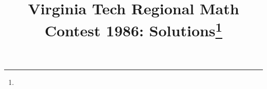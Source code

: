 \documentclass[10pt]{article}
\begin{document}
\title{Virginia Tech Regional Math Contest 1986: Solutions\footnote{\disclaimer}}
\author{\vspace{-2ex}}
\date{\vspace{-5ex}} %
\maketitle

%

%

%

%

%

%

%

%
\end{document}

